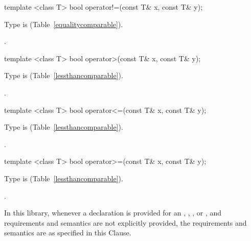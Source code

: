 %
\begin{itemdecl}
template <class T> bool operator!=(const T& x, const T& y);
\end{itemdecl}

\begin{itemdescr}
\pnum
\requires
Type  is  (Table~\ref{equalitycomparable}).

\pnum
\returns
{}.
\end{itemdescr}

%
\begin{itemdecl}
template <class T> bool operator>(const T& x, const T& y);
\end{itemdecl}

\begin{itemdescr}
\pnum
\requires
Type  is  (Table~\ref{lessthancomparable}).

\pnum
\returns
{}.
\end{itemdescr}

%
\begin{itemdecl}
template <class T> bool operator<=(const T& x, const T& y);
\end{itemdecl}

\begin{itemdescr}
\pnum
\requires
Type  is  (Table~\ref{lessthancomparable}).

\pnum
\returns
{}.
\end{itemdescr}

%
\begin{itemdecl}
template <class T> bool operator>=(const T& x, const T& y);
\end{itemdecl}

\begin{itemdescr}
\pnum
\requires
Type  is  (Table~\ref{lessthancomparable}).

\pnum
\returns
{}.
\end{itemdescr}

\pnum
In this library, whenever a declaration is provided for an ,
, , or ,
and requirements and semantics are not explicitly provided,
the requirements and semantics are as specified in this Clause.

